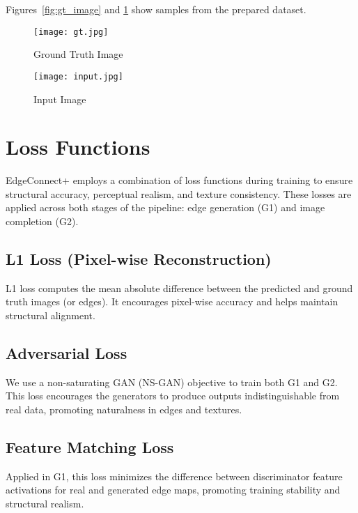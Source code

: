 \documentclass[10pt,twocolumn,letterpaper]{article}
\begin{document}
Figures~\ref{fig:gt_image} and \ref{fig:input_image} show samples from the prepared dataset.

\begin{figure}[h!]
    \centering
    \begin{minipage}{0.22\textwidth}
        \centering
        \texttt{[image: gt.jpg]}
        \caption{Ground Truth Image}
        \label{fig:gt_image}
    \end{minipage}\hfill
    \begin{minipage}{0.22\textwidth}
        \centering
        \texttt{[image: input.jpg]}
        \caption{Input Image}
        \label{fig:input_image}
    \end{minipage}
\end{figure}





\section{Loss Functions}

EdgeConnect+ employs a combination of loss functions during training to ensure structural accuracy, perceptual realism, and texture consistency. These losses are applied across both stages of the pipeline: edge generation (G1) and image completion (G2).

\subsection{L1 Loss (Pixel-wise Reconstruction)}
L1 loss computes the mean absolute difference between the predicted and ground truth images (or edges). It encourages pixel-wise accuracy and helps maintain structural alignment.

\subsection{Adversarial Loss}
We use a non-saturating GAN (NS-GAN) objective to train both G1 and G2. This loss encourages the generators to produce outputs indistinguishable from real data, promoting naturalness in edges and textures.

\subsection{Feature Matching Loss}
Applied in G1, this loss minimizes the difference between discriminator feature activations for real and generated edge maps, promoting training stability and structural realism.
\end{document}
